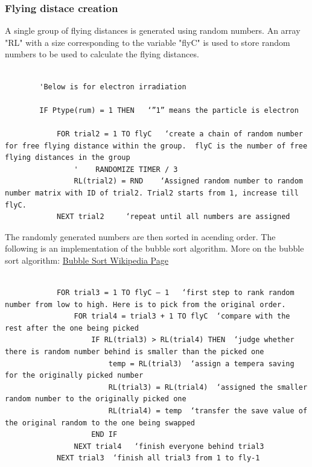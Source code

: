 \documentclass[10pt, reqno]{exam}
\begin{document}
\subsubsection{Flying distace creation}

A single group of flying distances is generated using random numbers. An array "RL" with a size corresponding to the variable "flyC" is used to store random numbers to be used to calculate the flying distances.

\begin{verbatim}
    
        'Below is for electron irradiation
    
        IF Ptype(rum) = 1 THEN   ‘”1” means the particle is electron
    
            FOR trial2 = 1 TO flyC   ‘create a chain of random number for free flying distance within the group.  flyC is the number of free flying distances in the group
                '    RANDOMIZE TIMER / 3   
                RL(trial2) = RND    ‘Assigned random number to random number matrix with ID of trial2. Trial2 starts from 1, increase till flyC. 
            NEXT trial2     ‘repeat until all numbers are assigned
\end{verbatim}

The randomly generated numbers are then sorted in acending order. The following is an implementation of the bubble sort algorithm. More on the bubble sort algorithm: \href{https://en.wikipedia.org/wiki/Bubble_sort}{Bubble Sort Wikipedia Page}

\begin{verbatim}

            FOR trial3 = 1 TO flyC – 1   ‘first step to rank random number from low to high. Here is to pick from the original order.
                FOR trial4 = trial3 + 1 TO flyC  ‘compare with the rest after the one being picked 
                    IF RL(trial3) > RL(trial4) THEN  ‘judge whether there is random number behind is smaller than the picked one
                        temp = RL(trial3)  ‘assign a tempera saving for the originally picked number
                        RL(trial3) = RL(trial4)  ‘assigned the smaller random number to the originally picked one
                        RL(trial4) = temp  ‘transfer the save value of the original random to the one being swapped
                    END IF
                NEXT trial4   ‘finish everyone behind trial3
            NEXT trial3  ‘finish all trial3 from 1 to fly-1
\end{verbatim}
\end{document}
